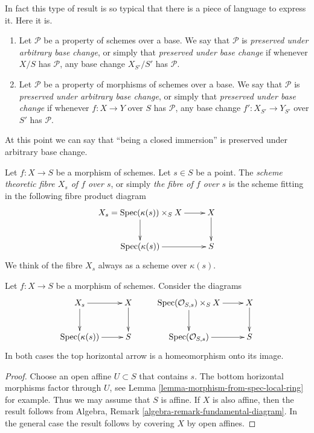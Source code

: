 \noindent
In fact this type of result is so typical that there is a
piece of language to express it. Here it is.

\begin{definition}
\label{definition-preserved-by-base-change}
\begin{enumerate}
\item Let $\mathcal{P}$ be a property of schemes over a base.
We say that $\mathcal{P}$ is {\it preserved under arbitrary base change},
or simply that {\it preserved under base change} if whenever $X/S$
has $\mathcal{P}$, any base change $X_{S'}/S'$ has $\mathcal{P}$.
\item Let $\mathcal{P}$ be a property of morphisms of schemes over a base.
We say that $\mathcal{P}$ is {\it preserved under arbitrary base change},
or simply that {\it preserved under base change} if whenever
$f : X \to Y$ over $S$ has $\mathcal{P}$, any base change
$f' : X_{S'} \to Y_{S'}$ over $S'$ has $\mathcal{P}$.
\end{enumerate}
\end{definition}

\noindent
At this point we can say that ``being a closed immersion'' is
preserved under arbitrary base change.

\begin{definition}
\label{definition-fibre}
Let $f : X \to S$ be a morphism of schemes.
Let $s \in S$ be a point.
The {\it scheme theoretic fibre $X_s$ of $f$ over $s$},
or simply {\it the fibre of $f$ over $s$}
is the scheme fitting in the following fibre product diagram
$$
\xymatrix{
X_s = \text{Spec}(\kappa(s)) \times_S X \ar[r] \ar[d] &
X \ar[d] \\
\text{Spec}(\kappa(s)) \ar[r] &
S
}
$$
We think of the fibre $X_s$ always as a scheme over $\kappa(s)$.
\end{definition}

\begin{lemma}
\label{lemma-fibre-topological}
Let $f : X \to S$ be a morphism of schemes.
Consider the diagrams
$$
\xymatrix{
X_s \ar[r] \ar[d] &
X \ar[d] &
\text{Spec}(\mathcal{O}_{S, s}) \times_S X \ar[r] \ar[d] &
X \ar[d]
\\
\text{Spec}(\kappa(s)) \ar[r] &
S &
\text{Spec}(\mathcal{O}_{S, s}) \ar[r] &
S
}
$$
In both cases the top horizontal arrow is a homeomorphism
onto its image.
\end{lemma}

\begin{proof}
Choose an open affine $U \subset S$ that contains $s$.
The bottom horizontal morphisms factor through $U$, see
Lemma \ref{lemma-morphism-from-spec-local-ring} for example.
Thus we may assume that $S$ is affine. If $X$ is also affine, then
the result follows from
Algebra, Remark \ref{algebra-remark-fundamental-diagram}.
In the general case the result follows by covering $X$ by open affines.
\end{proof}







